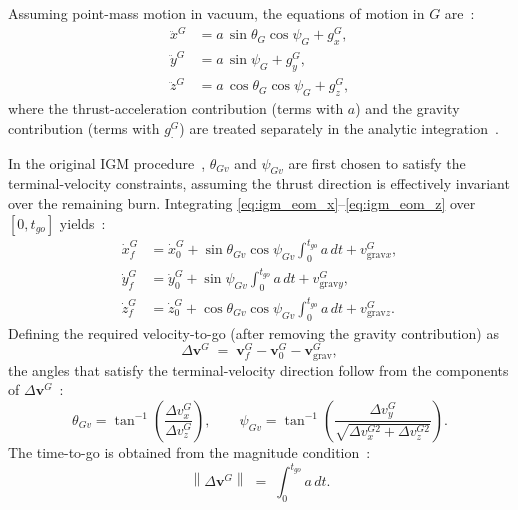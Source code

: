 Assuming point-mass motion in vacuum, the equations of motion in $G$ are~\cite{SONG2015463}:
\begin{align}
\ddot{x}^{G} &= a\,\sin\theta_G\cos\psi_G + g_x^{G},
\label{eq:igm_eom_x}\\
\ddot{y}^{G} &= a\,\sin\psi_G            + g_y^{G},
\label{eq:igm_eom_y}\\
\ddot{z}^{G} &= a\,\cos\theta_G\cos\psi_G + g_z^{G},
\label{eq:igm_eom_z}
\end{align}
where the thrust-acceleration contribution (terms with $a$) and the gravity contribution (terms with $g^G_\cdot$) are treated separately in the analytic integration~\cite{SONG2015463}.

In the original IGM procedure~\cite{ChandlerSmith1967IterativeGuidanceMode}, $\theta_{Gv}$ and $\psi_{Gv}$ are first chosen to satisfy the terminal-velocity constraints, assuming the thrust direction is effectively invariant over the remaining burn. Integrating \eqref{eq:igm_eom_x}--\eqref{eq:igm_eom_z} over $[0,t_{go}]$ yields~\cite{SONG2015463}:
\begin{align}
\dot{x}_f^{G} &= \dot{x}_0^{G} + \sin\theta_{Gv}\cos\psi_{Gv}\int_{0}^{t_{go}} a\,dt + v_{\mathrm{grav}x}^{G},
\label{eq:igm_vf_x}\\
\dot{y}_f^{G} &= \dot{y}_0^{G} + \sin\psi_{Gv}\int_{0}^{t_{go}} a\,dt + v_{\mathrm{grav}y}^{G},
\label{eq:igm_vf_y}\\
\dot{z}_f^{G} &= \dot{z}_0^{G} + \cos\theta_{Gv}\cos\psi_{Gv}\int_{0}^{t_{go}} a\,dt + v_{\mathrm{grav}z}^{G}.
\label{eq:igm_vf_z}
\end{align}
Defining the required velocity-to-go (after removing the gravity contribution) as~\cite{SONG2015463}
\begin{equation}
\Delta\mathbf{v}^{G} \;=\; \mathbf{v}_f^{G} - \mathbf{v}_0^{G} - \mathbf{v}_{\mathrm{grav}}^{G},
\label{eq:igm_dv}
\end{equation}
the angles that satisfy the terminal-velocity direction follow from the components of $\Delta\mathbf{v}^{G}$~\cite{SONG2015463}:
\begin{equation}
\theta_{Gv}=\tan^{-1}\!\left(\frac{\Delta v_x^{G}}{\Delta v_z^{G}}\right),
\qquad
\psi_{Gv}=\tan^{-1}\!\left(\frac{\Delta v_y^{G}}{\sqrt{\Delta v_x^{G2}+\Delta v_z^{G2}}}\right).
\label{eq:igm_angles_v}
\end{equation}
The time-to-go is obtained from the magnitude condition~\cite{SONG2015463}:
\begin{equation}
\left\lVert \Delta\mathbf{v}^{G} \right\rVert \;=\; \int_{0}^{t_{go}} a\,dt.
\label{eq:igm_tgo}
\end{equation}

